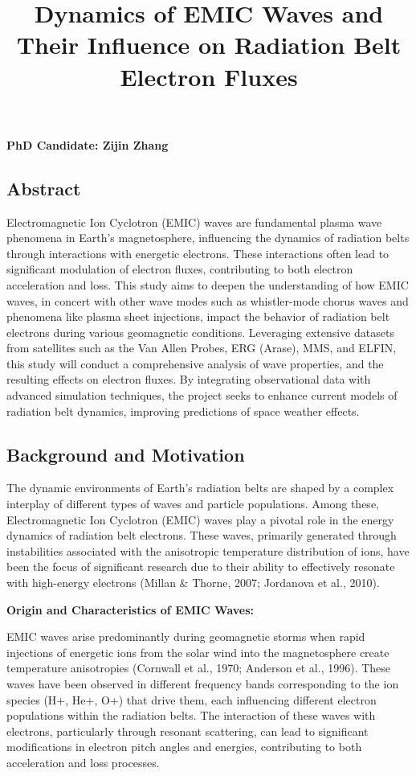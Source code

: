 \documentclass[
  letterpaper,
  DIV=11,
  numbers=noendperiod]{scrartcl}
\title{Dynamics of EMIC Waves and Their Influence on Radiation Belt Electron Fluxes}
\author{}
\date{}
\begin{document}
\maketitle

\textbf{PhD Candidate: Zijin Zhang}

\subsection{Abstract}\label{abstract}

Electromagnetic Ion Cyclotron (EMIC) waves are fundamental plasma wave phenomena in Earth's magnetosphere, influencing the dynamics of radiation belts through interactions with energetic electrons. These interactions often lead to significant modulation of electron fluxes, contributing to both electron acceleration and loss. This study aims to deepen the understanding of how EMIC waves, in concert with other wave modes such as whistler-mode chorus waves and phenomena like plasma sheet injections, impact the behavior of radiation belt electrons during various geomagnetic conditions. Leveraging extensive datasets from satellites such as the Van Allen Probes, ERG (Arase), MMS, and ELFIN, this study will conduct a comprehensive analysis of wave properties, and the resulting effects on electron fluxes. By integrating observational data with advanced simulation techniques, the project seeks to enhance current models of radiation belt dynamics, improving predictions of space weather effects.

\subsection{Background and Motivation}\label{background-and-motivation}

The dynamic environments of Earth's radiation belts are shaped by a complex interplay of different types of waves and particle populations. Among these, Electromagnetic Ion Cyclotron (EMIC) waves play a pivotal role in the energy dynamics of radiation belt electrons. These waves, primarily generated through instabilities associated with the anisotropic temperature distribution of ions, have been the focus of significant research due to their ability to effectively resonate with high-energy electrons (Millan \& Thorne, 2007; Jordanova et al., 2010).

\textbf{Origin and Characteristics of EMIC Waves:}

EMIC waves arise predominantly during geomagnetic storms when rapid injections of energetic ions from the solar wind into the magnetosphere create temperature anisotropies (Cornwall et al., 1970; Anderson et al., 1996). These waves have been observed in different frequency bands corresponding to the ion species (H+, He+, O+) that drive them, each influencing different electron populations within the radiation belts. The interaction of these waves with electrons, particularly through resonant scattering, can lead to significant modifications in electron pitch angles and energies, contributing to both acceleration and loss processes.
\end{document}
